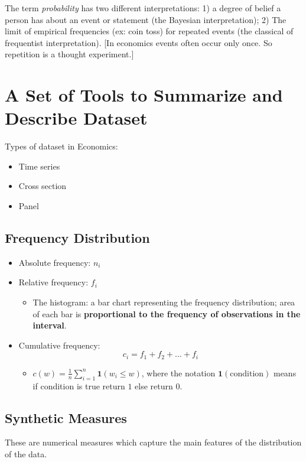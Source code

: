 The term \textit{probability} has two different interpretations: 1) a degree of belief a person has about an event or statement (the Bayesian interpretation); 2) The limit of empirical frequencies (ex: coin toss) for repeated events (the classical of frequentist interpretation). [In economics events often occur only once. So repetition is a thought experiment.]

\section{A Set of Tools to Summarize and Describe Dataset}

Types of dataset in Economics: \begin{itemize}
    \item Time series
    \item Cross section
    \item Panel
\end{itemize}

\subsection{Frequency Distribution}
\begin{itemize}
    \item Absolute frequency: $n_i$
    \item Relative frequency: $f_i$ \begin{itemize}
              \item The histogram: a bar chart representing the frequency distribution; area of each bar is \textbf{proportional to the frequency of observations in the interval}.
          \end{itemize}
    \item Cumulative frequency: \[
              c_i = f_1 + f_2+\dots+f_i
          \] \begin{itemize}
              \item $c(w) = \frac{1}{n}\sum_{i=1}^{n} \mathbf{1}(w_i \leq w)$, where the notation $\mathbf{1}(\text{condition})$ means if condition is true return $1$ else return $0$.
          \end{itemize}
\end{itemize}

\subsection{Synthetic Measures}
\begin{definition}
    These are numerical measures which capture the main features of the distribution of the data.
\end{definition}

